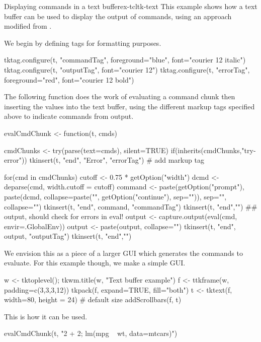 \begin{example}{Displaying commands in a text buffer}{ex-tcltk-text}
This example shows how a text buffer can be used to display the output
of \R\/ commands, using an approach modified from .

We begin by defining tags for formatting purposes.
\begin{Schunk}
\begin{Sinput}
 tktag.configure(t, "commandTag", foreground="blue", 
                 font="courier 12 italic")
 tktag.configure(t, "outputTag", font="courier 12")
 tktag.configure(t, "errorTag", foreground="red", 
                 font="courier 12 bold")
\end{Sinput}
\end{Schunk}

The following function does the work of evaluating a command chunk
then inserting the values into the text buffer, using the different
markup tags specified above to indicate commands from output.

\begin{Schunk}
\begin{Sinput}
 evalCmdChunk <- function(t, cmds) {
   
   cmdChunks <- try(parse(text=cmds), silent=TRUE)
   if(inherits(cmdChunks,"try-error")) {
     tkinsert(t, "end", "Error", "errorTag") # add markup tag
   }
 
   for(cmd in cmdChunks) {
     cutoff <- 0.75 * getOption("width")
     dcmd <- deparse(cmd, width.cutoff = cutoff)
     command <- 
       paste(getOption("prompt"),
             paste(dcmd, collapse=paste("\n", 
                           getOption("continue"), sep="")),
             sep="", collapse="")
     tkinsert(t, "end", command, "commandTag")
     tkinsert(t, "end","\n")
     ## output, should check for errors in eval!
     output <- capture.output(eval(cmd, envir=.GlobalEnv))
     output <- paste(output, collapse="\n")
     tkinsert(t, "end", output, "outputTag")
     tkinsert(t, "end","\n")
   }
 }
\end{Sinput}
\end{Schunk}


We envision this as a piece of a larger GUI which generates the
commands to evaluate. For this example though, we make a simple GUI.

\begin{Schunk}
\begin{Sinput}
 w <- tktoplevel(); tkwm.title(w, "Text buffer example")
 f <- ttkframe(w, padding=c(3,3,3,12))
 tkpack(f, expand=TRUE, fill="both")
 t <- tktext(f, width=80, height = 24)   # default size
 addScrollbars(f, t)
\end{Sinput}
\end{Schunk}
 
This is how it can be used.
\begin{Schunk}
\begin{Sinput}
 evalCmdChunk(t, "2 + 2; lm(mpg ~ wt, data=mtcars)")
\end{Sinput}
\end{Schunk}
\end{example}


